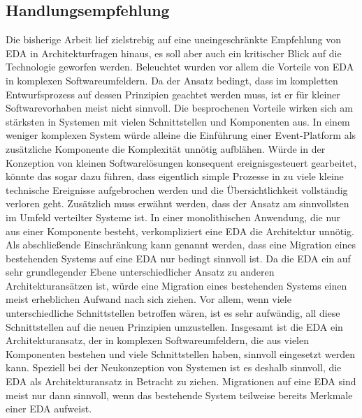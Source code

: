 \subsection{Handlungsempfehlung}
Die bisherige Arbeit lief zielstrebig auf eine uneingeschränkte Empfehlung von \ac{EDA} in Architekturfragen hinaus, es soll aber auch ein kritischer Blick auf die Technologie geworfen werden. 
Beleuchtet wurden vor allem die Vorteile von \ac{EDA} in komplexen Softwareumfeldern. Da der Ansatz bedingt, dass im kompletten Entwurfsprozess auf dessen Prinzipien geachtet werden muss, ist er für kleiner Softwarevorhaben meist nicht sinnvoll. Die besprochenen Vorteile wirken sich am stärksten in Systemen mit vielen Schnittstellen und Komponenten aus. In einem weniger komplexen System würde alleine die Einführung einer Event-Platform als zusätzliche Komponente die Komplexität unnötig aufblähen. Würde in der Konzeption von kleinen Softwarelösungen konsequent ereignisgesteuert gearbeitet, könnte das sogar dazu führen, dass eigentlich simple Prozesse in zu viele kleine technische Ereignisse aufgebrochen werden und die Übersichtlichkeit vollständig verloren geht. 
Zusätzlich muss erwähnt werden, dass der Ansatz am sinnvollsten im Umfeld verteilter Systeme ist. In einer monolithischen Anwendung, die nur aus einer Komponente besteht, verkompliziert eine \ac{EDA} die Architektur unnötig. 
Als abschließende Einschränkung kann genannt werden, dass eine Migration eines bestehenden Systems auf eine \ac{EDA} nur bedingt sinnvoll ist. Da die \ac{EDA} ein auf sehr grundlegender Ebene unterschiedlicher Ansatz zu anderen Architekturansätzen ist, würde eine Migration eines bestehenden Systems einen meist erheblichen Aufwand nach sich ziehen. Vor allem, wenn viele unterschiedliche Schnittstellen betroffen wären, ist es sehr aufwändig, all diese Schnittstellen auf die neuen Prinzipien umzustellen. 
Insgesamt ist die \ac{EDA} ein Architekturansatz, der in komplexen Softwareumfeldern, die aus vielen Komponenten bestehen und viele Schnittstellen haben, sinnvoll eingesetzt werden kann. Speziell bei der Neukonzeption von Systemen ist es deshalb sinnvoll, die \ac{EDA} als Architekturansatz in Betracht zu ziehen. Migrationen auf eine \ac{EDA} sind meist nur dann sinnvoll, wenn das bestehende System teilweise bereits Merkmale einer \ac{EDA} aufweist.

